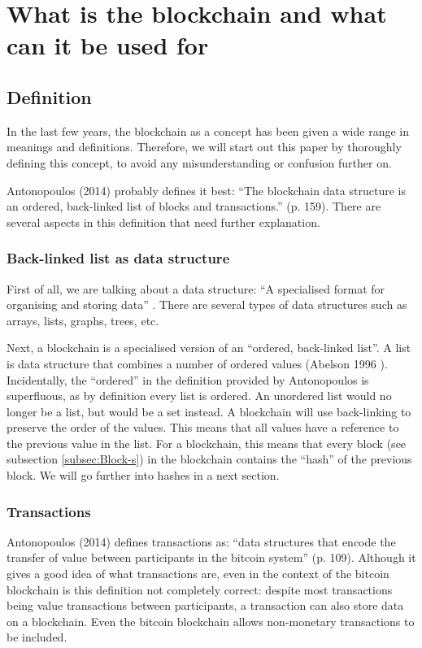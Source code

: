 \chapter{What is the blockchain and what can it be used for}


\section{Definition}
In the last few years, the blockchain as a concept has been given a wide range in meanings and definitions. Therefore, we will start out this paper by thoroughly defining this concept, to avoid any misunderstanding or confusion further on.

Antonopoulos (2014) \cite{antonopoulos:2014} probably defines it best: ``The blockchain data structure is an ordered, back-linked list of blocks and transactions.'' (p. 159). There are several aspects in this definition that need further explanation.

\subsection{Back-linked list as data structure}

First of all, we are talking about a data structure: ``A specialised format for organising and storing data'' \cite{data-structure}. There are several types of data structures such as arrays, lists, graphs, trees, etc.

Next, a blockchain is a specialised version of an ``ordered, back-linked list''. A list is data structure that combines a number of ordered values (Abelson 1996 \cite{abelson:1996}).  Incidentally, the ``ordered'' in the definition provided by Antonopoulos is superfluous, as by definition every list is ordered. An unordered list would no longer be a list, but would be a set instead. A blockchain will use back-linking to preserve the order of the values. This means that all values have a reference to the previous value in the list. For a blockchain, this means that every block (see subsection \ref{subsec:Block-s}) in the blockchain contains the ``hash'' of the previous block. We will go further into hashes in a next section.

\subsection{Transactions}

Antonopoulos (2014) \cite{antonopoulos:2014} defines transactions as: ``data structures that encode the transfer of value between participants in the bitcoin system'' (p. 109). Although it gives a good idea of what transactions are, even in the context of the bitcoin blockchain is this definition not completely correct: despite most transactions being value transactions between participants, a transaction can also store data on a blockchain. Even the bitcoin blockchain allows non-monetary transactions to be included.

